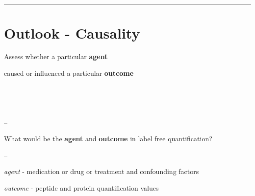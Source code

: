 \documentclass[]{article}
\begin{document}
\begin{center}\rule{0.5\linewidth}{\linethickness}\end{center}

\hypertarget{outlook---causality}{%
\section{Outlook - Causality}\label{outlook---causality}}

Assess whether a particular \textbf{agent}

caused or influenced a particular \textbf{outcome}

\(~\)

\(~\)

--

What would be the \textbf{agent} and \textbf{outcome} in label free
quantification?

--

\emph{agent} - medication or drug or treatment and confounding factors

\emph{outcome} - peptide and protein quantification values
\end{document}
